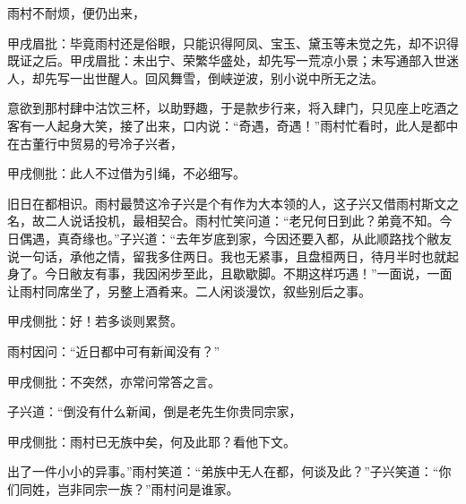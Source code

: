 \begin{parag}
    雨村不耐烦，便仍出来，\begin{note}甲戌眉批：毕竟雨村还是俗眼，只能识得阿凤、宝玉、黛玉等未觉之先，却不识得既证之后。甲戌眉批：未出宁、荣繁华盛处，却先写一荒凉小景；未写通部入世迷人，却先写一出世醒人。回风舞雪，倒峡逆波，别小说中所无之法。\end{note}意欲到那村肆中沽饮三杯，以助野趣，于是款步行来，将入肆门，只见座上吃酒之客有一人起身大笑，接了出来，口内说：“奇遇，奇遇！”雨村忙看时，此人是都中在古董行中贸易的号冷子兴者，\begin{note}甲戌侧批：此人不过借为引绳，不必细写。\end{note}旧日在都相识。雨村最赞这冷子兴是个有作为大本领的人，这子兴又借雨村斯文之名，故二人说话投机，最相契合。雨村忙笑问道：“老兄何日到此？弟竟不知。今日偶遇，真奇缘也。”子兴道：“去年岁底到家，今因还要入都，从此顺路找个敝友说一句话，承他之情，留我多住两日。我也无紧事，且盘桓两日，待月半时也就起身了。今日敝友有事，我因闲步至此，且歇歇脚。不期这样巧遇！”一面说，一面让雨村同席坐了，另整上酒肴来。二人闲谈漫饮，叙些别后之事。\begin{note}甲戌侧批：好！若多谈则累赘。\end{note}
\end{parag}


\begin{parag}
    雨村因问：“近日都中可有新闻没有？”\begin{note}甲戌侧批：不突然，亦常问常答之言。\end{note}子兴道：“倒没有什么新闻，倒是老先生你贵同宗家，\begin{note}甲戌侧批：雨村已无族中矣，何及此耶？看他下文。\end{note}出了一件小小的异事。”雨村笑道：“弟族中无人在都，何谈及此？”子兴笑道：“你们同姓，岂非同宗一族？”雨村问是谁家。
\end{parag}


